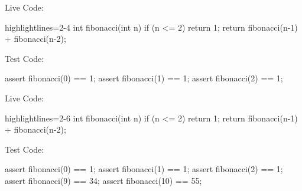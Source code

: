 \documentclass{article}
\begin{document}

\begin{pptWide}{2}
Live Code:\par
{\small\begin{ffcode*}{highlightlines={2-4}}
int fibonacci(int n) {
  if (n <= 2) {
    return 1;
  }
  return fibonacci(n-1)
    + fibonacci(n-2);
}
\end{ffcode*}
}
\par\columnbreak\par
Test Code:\par
{\small\begin{ffcode*}{}
assert fibonacci(0) == 1;
assert fibonacci(1) == 1;
assert fibonacci(2) == 1;
\end{ffcode*}
}
\end{pptWide}
\plush{}

\begin{pptWide}{2}
Live Code:\par
{\small\begin{ffcode*}{highlightlines={2-6}}
int fibonacci(int n) {
  if (n <= 2) {
    return 1;
  }
  return fibonacci(n-1)
    + fibonacci(n-2);
}
\end{ffcode*}
}
\par\columnbreak\par
Test Code:\par
{\small\begin{ffcode*}{}
assert fibonacci(0) == 1;
assert fibonacci(1) == 1;
assert fibonacci(2) == 1;
assert fibonacci(9) == 34;
assert fibonacci(10) == 55;
\end{ffcode*}
}
\end{pptWide}
\plush{}

\end{document}
